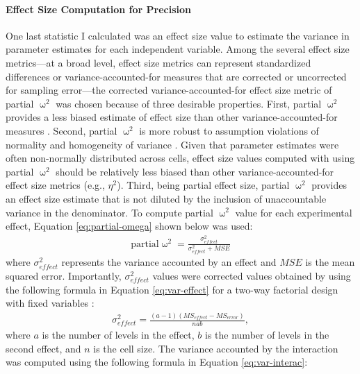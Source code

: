 \documentclass[
12pt, %
twoside,
english]{guelphthesis}
\begin{document}
\hypertarget{effect-size-computation-for-precision}{%
\paragraph{Effect Size Computation for Precision}\label{effect-size-computation-for-precision}}

One last statistic I calculated was an effect size value to estimate the variance in parameter estimates for each independent variable. Among the several effect size metrics---at a broad level, effect size
metrics can represent standardized differences or variance-accounted-for
measures that are corrected or uncorrected for sampling error---the corrected
variance-accounted-for effect size metric of partial \(\upomega^2\) was
chosen because of three desirable properties. First, partial
\(\upomega^2\) provides a less biased estimate of effect size than other
variance-accounted-for measures \autocite{okada2013}. Second, partial \(\upomega^2\) is more
robust to assumption violations of normality and homogeneity of variance
\autocite{yigit2018}. Given that parameter estimates were often non-normally distributed across cells, effect size values computed with using partial \(\upomega^2\) should be relatively less biased than
other variance-accounted-for effect size metrics (e.g., \(\eta^2\)). Third, being partial effect size, partial \(\upomega^2\) provides an effect size estimate that is not diluted by the inclusion of unaccountable variance in the denominator. To compute partial \(\upomega^2\) value for each experimental effect, Equation \ref{eq:partial-omega} shown below was used:
\begin{align}
\text{partial} \upomega^2 = \frac{\sigma^2_{effect}}{\sigma^2_{effect} + MSE} 
\label{eq:partial-omega}
\end{align}
\noindent where \(\sigma^2_{effect}\) represents the variance accounted by an effect and \(MSE\) is the mean squared error. Importantly, \(\sigma^2_{effect}\) values were corrected values obtained by using the following formula in Equation \ref{eq:var-effect} for a two-way factorial design with fixed variables \autocite{howell2009}:
\begin{align}
 \sigma^2_{effect} = \frac{(a - 1)(MS_{effect} - MS_{error})}{nab},
\label{eq:var-effect}
\end{align}
\noindent where \(a\) is the number of levels in the effect, \(b\) is the number of levels in the second effect, and \(n\) is the cell size. The variance accounted by the interaction was computed using the following formula in Equation \ref{eq:var-interac}:
\end{document}
